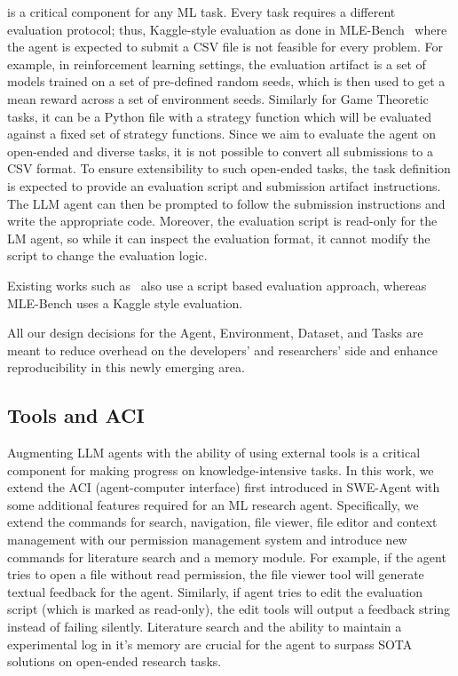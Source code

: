  is a critical component for any ML task.
% 
Every task requires a different evaluation protocol; thus, Kaggle-style evaluation as done in MLE-Bench~\citep{chanMLEbenchEvaluatingMachine2024} where the agent is expected to submit a CSV file is not feasible for every problem. 
For example, in reinforcement learning settings, the evaluation artifact is a set of models trained on a set of pre-defined random seeds, which is then used to get a mean reward across a set of environment seeds. Similarly for Game Theoretic tasks, it can be a Python file with a strategy function which will be evaluated against a fixed set of strategy functions.
%
Since we aim to evaluate the agent on open-ended and diverse tasks, it is not possible to convert all submissions to a CSV format.
%
To ensure extensibility to such open-ended tasks, the task definition is expected to provide an evaluation script and submission artifact instructions.
%
The LLM agent can then be prompted to follow the submission instructions and write the appropriate code.
%
Moreover, the evaluation script is read-only for the LM agent, so while it can inspect the evaluation format, it cannot modify the script to change the evaluation logic.

Existing works such as~\citet{huangMLAgentBenchEvaluatingLanguage2024,rebench-metr,chenScienceAgentBenchRigorousAssessment2024} also use a script based evaluation approach, whereas MLE-Bench \citep{chanMLEbenchEvaluatingMachine2024} uses a Kaggle style evaluation.

% 
All our design decisions for the Agent, Environment, Dataset, and Tasks are meant to reduce overhead on the developers' and researchers' side and enhance reproducibility in this newly emerging area.


\subsection{Tools and ACI}
\label{sec:tools}
Augmenting LLM agents with the ability of using external tools is a critical component for making progress on knowledge-intensive tasks.
%
In this work, we extend the ACI (agent-computer interface) first introduced in SWE-Agent \citep{yangSWEagentAgentComputerInterfaces2024} with some additional features required for an ML research agent. 
%
Specifically, we extend the commands for search, navigation, file viewer, file editor and context management with our permission management system and introduce new commands for literature search and a memory module.
For example, if the agent tries to open a file without read permission, the file viewer tool will generate textual feedback for the agent. Similarly, if agent tries to edit the evaluation script (which is marked as read-only), the edit tools will output a feedback string instead of failing silently.
Literature search and the ability to maintain a experimental log in it's memory are crucial for the agent to surpass SOTA solutions on open-ended research tasks.
%

